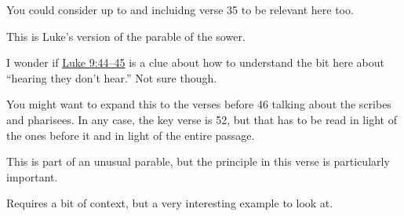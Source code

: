 \begin{compactdesc}
\begin{compactitem}
					\end{compactitem}
				\item[{\hyperref[MARK-13-11]{Mark 13:11}}]
				\item[{\hyperref[LUKE-2-25]{Luke 2:25--27}}] \phantom{.}
					\begin{compactitem}
						\item You could consider up to and incluidng verse 35 to be relevant here too.
					\end{compactitem}
				\item[{\hyperref[LUKE-8-4]{Luke 8:4--18}}] \phantom{.}
					\begin{compactitem}
						\item This is Luke's version of the parable of the sower.
						\item I wonder if \hyperref[LUKE-9-44]{Luke 9:44--45} is a clue about how to understand the bit here about ``hearing they don't hear.'' Not sure though. 
					\end{compactitem}
				\item[{\hyperref[LUKE-9-44]{Luke 9:44--45}}] \phantom{.}
				\item[{\hyperref[LUKE-10-21]{Luke 10:21--24}}] \phantom{.}
				\item[{\hyperref[LUKE-11-46]{Luke 11:46--52}}] \phantom{.}
					\begin{compactitem}
						\item You might want to expand this to the verses before 46 talking about the scribes and pharisees. In any case, the key verse is 52, but that has to be read in light of the ones before it and in light of the entire passage.
					\end{compactitem}
				\item[{\hyperref[LUKE-12-1]{Luke 12:1--3}}] \phantom{.}
				\item[{\hyperref[LUKE-12-11]{Luke 12:11--12}}] \phantom{.}
				\item[{\hyperref[LUKE-16-10]{Luke 16:10}}] \phantom{.}
					\begin{compactitem}
						\item This is part of an unusual parable, but the principle in this verse is particularly important.
					\end{compactitem}
				\item[{\hyperref[LUKE-18-34]{Luke 18:34}}] \phantom{.}
					\begin{compactitem}
						\item Requires a bit of context, but a very interesting example to look at.

\end{compactitem}
\end{compactdesc}
